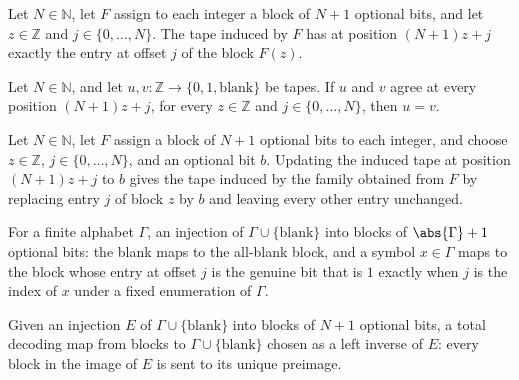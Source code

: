 \begin{lemma}
\label{Turing.FinTM.arTape_at}
\leanok
{}
Let $N\in\mathbb{N}$, let $F$ assign to each integer a block of $N+1$ optional bits, and
let $z\in\mathbb{Z}$ and $j\in\{0,\ldots,N\}$. The tape induced by $F$ has at position
$(N+1)z+j$ exactly the entry at offset $j$ of the block $F(z)$.
\end{lemma}

\begin{lemma}
\label{Turing.FinTM.arTape_ext}
\leanok
{}
Let $N\in\mathbb{N}$, and let $u,v:\mathbb{Z}\to\{0,1,\text{blank}\}$ be tapes. If $u$
and $v$ agree at every position $(N+1)z+j$, for every $z\in\mathbb{Z}$ and
$j\in\{0,\ldots,N\}$, then $u=v$.
\end{lemma}

\begin{lemma}
\label{Turing.FinTM.arTape_update}
\leanok
{}
Let $N\in\mathbb{N}$, let $F$ assign a block of $N+1$ optional bits to each integer, and
choose $z\in\mathbb{Z}$, $j\in\{0,\ldots,N\}$, and an optional bit $b$. Updating the
induced tape at position $(N+1)z+j$ to $b$ gives the tape induced by the family obtained
from $F$ by replacing entry $j$ of block $z$ by $b$ and leaving every other entry
unchanged.
\end{lemma}

\begin{definition}
\label{Turing.FinTM.arCode}
\leanok
{}
For a finite alphabet $\Gamma$, an injection of $\Gamma \cup \{\text{blank}\}$ into
blocks of $\abs{\Gamma}+1$ optional bits: the blank maps to the all-blank block, and a
symbol $x \in \Gamma$ maps to the block whose entry at offset $j$ is the genuine bit
that is $1$ exactly when $j$ is the index of $x$ under a fixed enumeration of
$\Gamma$.
\end{definition}

\begin{definition}
\label{Turing.FinTM.arDecode}
\leanok
{}
Given an injection $E$ of $\Gamma \cup \{\text{blank}\}$ into blocks of $N+1$ optional
bits, a total decoding map from blocks to $\Gamma \cup \{\text{blank}\}$ chosen as a
left inverse of $E$: every block in the image of $E$ is sent to its unique preimage.
\end{definition}

